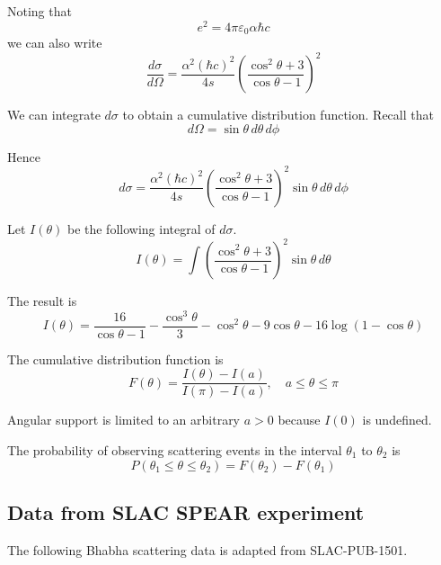 \documentclass[12pt]{article}
\begin{document}
Noting that
\begin{equation*}
e^2=4\pi\varepsilon_0\alpha\hbar c
\end{equation*}
we can also write
\begin{equation*}
\frac{d\sigma}{d\Omega}
=\frac{\alpha^2(\hbar c)^2}{4s}
\left(\frac{\cos^2\theta+3}{\cos\theta-1}\right)^2
\end{equation*}

We can integrate $d\sigma$ to obtain a cumulative distribution function.
Recall that
\begin{equation*}
d\Omega=\sin\theta\,d\theta\,d\phi
\end{equation*}

Hence
\begin{equation*}
d\sigma=\frac{\alpha^2(\hbar c)^2}{4s}
\left(
\frac{\cos^2\theta+3}{\cos\theta-1}
\right)^2
\sin\theta\,d\theta\,d\phi
\end{equation*}

Let $I(\theta)$ be the following integral of $d\sigma$.
\begin{equation*}
I(\theta)=\int
\left(
\frac{\cos^2\theta+3}{\cos\theta-1}
\right)^2
\sin\theta\,d\theta
\end{equation*}


The result is
\begin{equation*}
I(\theta)=\frac{16}{\cos\theta-1}-\frac{\cos^3\theta}{3}-\cos^2\theta-9\cos\theta-16\log(1-\cos\theta)
\end{equation*}

The cumulative distribution function is
\begin{equation*}
F(\theta)=\frac{I(\theta)-I(a)}{I(\pi)-I(a)},
\quad
a\le\theta\le\pi
\end{equation*}

Angular support is limited to an arbitrary $a>0$ because $I(0)$ is undefined.

\bigskip
The probability of observing scattering events in the interval $\theta_1$ to $\theta_2$ is
\begin{equation*}
P(\theta_1\le\theta\le\theta_2)=F(\theta_2)-F(\theta_1)
\end{equation*}

\subsection*{Data from SLAC SPEAR experiment}
The following Bhabha scattering data is adapted from SLAC-PUB-1501.
\end{document}
